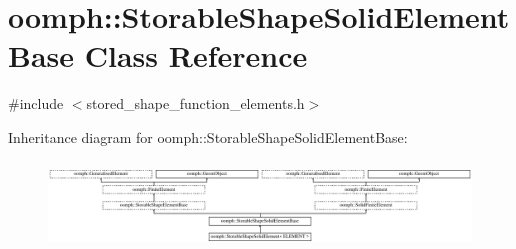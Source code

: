 \hypertarget{classoomph_1_1StorableShapeSolidElementBase}{}\section{oomph\+:\+:Storable\+Shape\+Solid\+Element\+Base Class Reference}
\label{classoomph_1_1StorableShapeSolidElementBase}


{\ttfamily \#include $<$stored\+\_\+shape\+\_\+function\+\_\+elements.\+h$>$}

Inheritance diagram for oomph\+:\+:Storable\+Shape\+Solid\+Element\+Base\+:\begin{figure}[H]
\begin{center}
\leavevmode
\includegraphics[height=2.333333cm]{classoomph_1_1StorableShapeSolidElementBase}
\end{center}
\end{figure}
